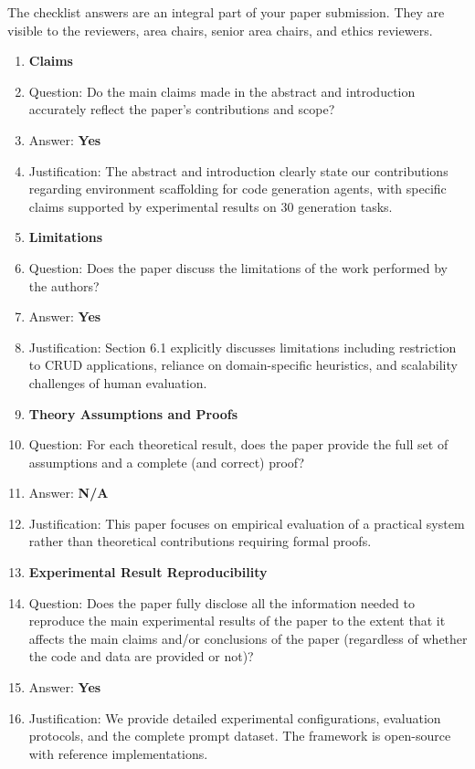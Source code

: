 \documentclass{article}
\begin{document}
The checklist answers are an integral part of your paper submission. They are visible to the reviewers, area chairs, senior area chairs, and ethics reviewers.

\begin{enumerate}

\item {\bf Claims}
    \item[] Question: Do the main claims made in the abstract and introduction accurately reflect the paper's contributions and scope?
    \item[] Answer: \textbf{Yes}
    \item[] Justification: The abstract and introduction clearly state our contributions regarding environment scaffolding for code generation agents, with specific claims supported by experimental results on 30 generation tasks.

\item {\bf Limitations}
    \item[] Question: Does the paper discuss the limitations of the work performed by the authors?
    \item[] Answer: \textbf{Yes}
    \item[] Justification: Section 6.1 explicitly discusses limitations including restriction to CRUD applications, reliance on domain-specific heuristics, and scalability challenges of human evaluation.

\item {\bf Theory Assumptions and Proofs}
    \item[] Question: For each theoretical result, does the paper provide the full set of assumptions and a complete (and correct) proof?
    \item[] Answer: \textbf{N/A}
    \item[] Justification: This paper focuses on empirical evaluation of a practical system rather than theoretical contributions requiring formal proofs.

\item {\bf Experimental Result Reproducibility}
    \item[] Question: Does the paper fully disclose all the information needed to reproduce the main experimental results of the paper to the extent that it affects the main claims and/or conclusions of the paper (regardless of whether the code and data are provided or not)?
    \item[] Answer: \textbf{Yes}
    \item[] Justification: We provide detailed experimental configurations, evaluation protocols, and the complete prompt dataset. The framework is open-source with reference implementations.


\end{enumerate}
\end{document}
